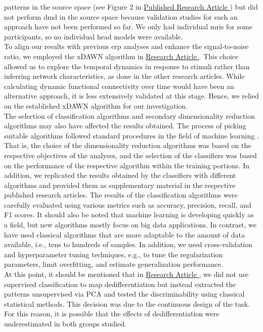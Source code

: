 patterns in the source space (see Figure 2 in \hyperref[pub:paperIII]{Published Research Article }) but did not perform \gls{dmd} in the source space because validation studies for such an approach have not been performed so far. We only had individual \glspl{mri} for some participants, so no individual head models were available.\\
To align our results with previous \gls{erp} analyses and enhance the signal-to-noise ratio, we employed the xDAWN algorithm in \hyperref[results:paperII]{Research Article }. This choice allowed us to explore the temporal dynamics in response to stimuli rather than inferring network characteristics, as done in the other research articles. While calculating dynamic functional connectivity over time would have been an alternative approach, it is less extensively validated at this stage. Hence, we relied on the established xDAWN algorithm for our investigation.\\
The selection of classification algorithms and secondary dimensionality reduction algorithms may also have affected the results obtained. The process of picking suitable algorithms followed standard procedures in the field of machine learning \cite{Shalev2014}. That is, the choice of the dimensionality reduction algorithms was based on the respective objectives of the analyses, and the selection of the classifiers was based on the performance of the respective algorithm within the training portions. In addition, we replicated the results obtained by the classifiers with different algorithms and provided them as supplementary material in the respective published research articles. The results of the classification algorithms were carefully evaluated using various metrics such as accuracy, precision, recall, and F1 scores. It should also be noted that machine learning is developing quickly as a field, but new algorithms mostly focus on big data applications. In contrast, we have used classical algorithms that are more adaptable to the amount of data available, i.e., tens to hundreds of samples. In addition, we used cross-validation and hyperparameter tuning techniques, e.g., to tune the regularization parameters, limit overfitting, and estimate generalization performance.\\
At this point, it should be mentioned that in \hyperref[results:paperIII]{Research Article }, we did not use supervised classification to map dedifferentiation but instead extracted the patterns unsupervised via PCA and tested the discriminability using classical statistical methods. This decision was due to the continuous design of the task. For this reason, it is possible that the effects of dedifferentiation were underestimated in both groups studied.\\
